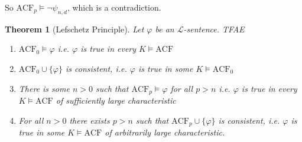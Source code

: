\documentclass[]{article}
\theoremstyle{custhm}
\theoremstyle{cusdef}
\theoremstyle{custhm}
\theoremstyle{custhm}
\theoremstyle{custhm}
\theoremstyle{ex}
\theoremstyle{custhm}
\newtheorem*{theorem*}{Theorem}
\theoremstyle{cusdef}
\theoremstyle{remark}
\renewcommand{\L}{\mathcal{L}}
\renewcommand{\it}[1]{\textit{#1}}
\renewcommand{\phi}{\varphi}
\newcommand{\acf}{\textrm{ACF}}
\begin{document}
So $\acf_p\models \neg\psi_{n,d}$, which is a contradiction.
\begin{theorem*}[Lefschetz Principle]
Let $\phi$ be an $\L$-sentence. TFAE
\begin{enumerate}[label=(\arabic*)]
	\item $\acf_0\models \phi$ {\it i.e.} $\phi$ is true in every $K\models \acf$
	\item $\acf_0\cup\{\phi\}$ is consistent, {\it i.e.} $\phi$ is true in some $K\models \acf_0$
	\item There is some $n > 0$ such that $\acf_p\models\phi$ for all $p > n$ {\it i.e.} $\phi$ is true in every $K\models \acf$ of sufficiently large characteristic
	\item For all $n > 0$ there exists $p > n$ such that $\acf_p\cup\{\phi\}$ is consistent, {\it i.e.} $\phi$ is true in some $K\models \acf$ of arbitrarily large characteristic.
\end{enumerate}
\end{theorem*}
\end{document}
